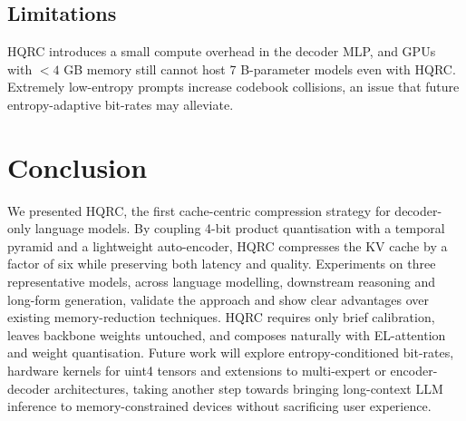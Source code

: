 \documentclass{article}
\begin{document}
\subsection{Limitations}
HQRC introduces a small compute overhead in the decoder MLP, and GPUs with \(<4\) GB memory still cannot host 7 B-parameter models even with HQRC. Extremely low-entropy prompts increase codebook collisions, an issue that future entropy-adaptive bit-rates may alleviate.

\section{Conclusion}
We presented HQRC, the first cache-centric compression strategy for decoder-only language models. By coupling 4-bit product quantisation with a temporal pyramid and a lightweight auto-encoder, HQRC compresses the KV cache by a factor of six while preserving both latency and quality. Experiments on three representative models, across language modelling, downstream reasoning and long-form generation, validate the approach and show clear advantages over existing memory-reduction techniques. HQRC requires only brief calibration, leaves backbone weights untouched, and composes naturally with EL-attention and weight quantisation. Future work will explore entropy-conditioned bit-rates, hardware kernels for uint4 tensors and extensions to multi-expert or encoder-decoder architectures, taking another step towards bringing long-context LLM inference to memory-constrained devices without sacrificing user experience.




\end{document}
